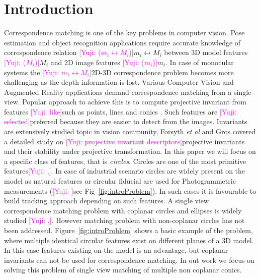 \documentclass{bmvc2k}
\newcommand{\yuji}[1]{\textcolor{magenta}{[Yuji: #1]}}
\newcommand{\fref}[1]{Fig\bmvaOneDot~\ref{#1}}
\newcommand{\Fref}[1]{Figure~\ref{#1}}
\def\etal{\emph{et al}\bmvaOneDot}
\begin{document}
\section{Introduction}
\label{sec:intro}

Correspondence matching is one of the key problems in computer vision.
Pose estimation and object recognition applications require accurate knowledge of correspondence relation \yuji{($ m_i \leftrightarrow M_i $)}{$ m_i \leftrightarrow M_i $} between 3D model features \yuji{($ M_i $)}{$ M_i $} and 2D image features \yuji{($ m_i $)}{$ m_i $}. 
In case of monocular systems the \yuji{$ m_i \leftrightarrow M_i $}{2D-3D correspondence} problem becomes more challenging as the depth information is lost.
Various Computer Vision and Augmented Reality applications demand correspondence matching from a single view.
Popular approach to achieve this is to compute projective invariant from features \yuji{like}{such as} points, lines and conics \cite{hartley_multiple_2003}.
Such features are \yuji{selected}{preferred} because they are easier to detect from the images. 
Invariants are extensively studied topic in vision community, Forsyth \etal \cite{forsyth_91} and Gros \cite{gros_projective_1992} covered a detailed study on \yuji{projective invariant descriptors}{projective invariants} and their stability under projective transformation. 
In this paper we will focus on a specific class of features, that is \textit{circles}. 
Circles are one of the most primitive features\yuji{,}{.}
In case of industrial scenario circles are widely present on the model as natural features or circular fiducial are used for Photogrammetric measurements \cite{luhmann_close_2006} (\yuji{}{see} \fref{fig:introProblem}).
In such cases it is favourable to build tracking approach depending on such features. 
A single view correspondence matching problem with coplanar circles and ellipses is widely studied \cite{lepetit_monocular_2005}\yuji{,}{.}
However matching problem with non-coplanar circles has not been addressed. 
\Fref{fig:introProblem} shows a basic example of the problem, where multiple identical circular features exist on different planes of a 3D model.
In this case features existing on the model is an advantage, but coplanar invariants can not be used for correspondence matching.
In out work we focus on solving this problem of single view matching of multiple non coplanar conics. 
\end{document}
